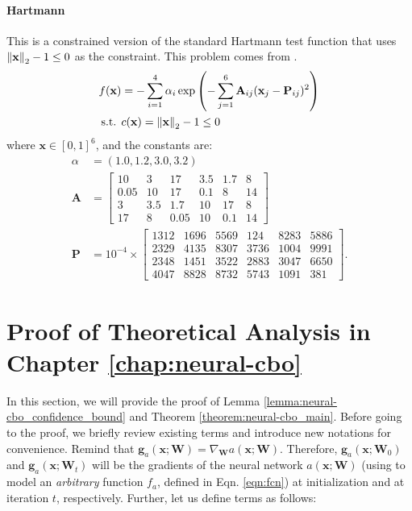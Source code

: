 \paragraph{Hartmann} This is a constrained version of the standard Hartmann test function that uses $\norm{\mathbf{x}}_2 -1 \le 0$  as the constraint. This problem comes from \citet{letham2019constrained}.
\begin{align*}    
f(\mathbf{x}) &= -\sum_{i=1}^{4} \alpha_i \exp \left( -\sum_{j=1}^{6} \mathbf{A}_{ij} (\mathbf{x}_j - \mathbf{P}_{ij})^2 \right)
\\
\text{s.t. } & c(\mathbf{x}) = \norm{\mathbf{x}}_2 -1 \le 0
\end{align*}
where \( \mathbf{x} \in [0,1]^6 \), and the constants are:
\begin{align*}
   \alpha & = (1.0, 1.2, 3.0, 3.2)
\\
\mathbf{A} &= \begin{bmatrix}
10 & 3 & 17 & 3.5 & 1.7 & 8 \\
0.05 & 10 & 17 & 0.1 & 8 & 14 \\
3 & 3.5 & 1.7 & 10 & 17 & 8 \\
17 & 8 & 0.05 & 10 & 0.1 & 14
\end{bmatrix}\\
\mathbf{P} &= 10^{-4} \times \begin{bmatrix}
1312 & 1696 & 5569 & 124 & 8283 & 5886 \\
2329 & 4135 & 8307 & 3736 & 1004 & 9991 \\
2348 & 1451 & 3522 & 2883 & 3047 & 6650 \\
4047 & 8828 & 8732 & 5743 & 1091 & 381
\end{bmatrix}. 
\end{align*}


\section{Proof of Theoretical Analysis in Chapter \ref{chap:neural-cbo}}
\label{section:neural-cbo_appendix}

In this section, we will provide the proof of Lemma \ref{lemma:neural-cbo_confidence_bound} and Theorem \ref{theorem:neural-cbo_main}. Before going to the proof, we briefly review existing terms and introduce new notations for convenience.
Remind that $\mathbf{g}_{a}(\mathbf{x}; \mathbf{W}) = \nabla_{\mathbf{W}}a(\mathbf{x}; \mathbf{W})$. Therefore, $\mathbf{g}_{a}(\mathbf{x}; \mathbf{W}_0)$ and $\mathbf{g}_{a}(\mathbf{x}; \mathbf{W}_t)$ will be the gradients of the neural network $a(\mathbf{x}; \mathbf{W})$ (using to model an \textit{arbitrary} function $f_a$, defined in Eqn. \ref{eqn:fcn}) at initialization and at iteration $t$, respectively.  Further, let us define terms as follows:


